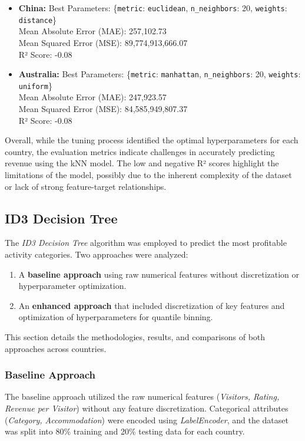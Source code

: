 \documentclass{article}
\begin{document}
\begin{itemize}
    \item \textbf{China:}
    Best Parameters: \{\texttt{metric}: \texttt{euclidean}, \texttt{n\_neighbors}: 20, \texttt{weights}: \texttt{distance}\} \\
    Mean Absolute Error (MAE): 257,102.73 \\
    Mean Squared Error (MSE): 89,774,913,666.07 \\
    R² Score: -0.08 \\

    \item \textbf{Australia:}
    Best Parameters: \{\texttt{metric}: \texttt{manhattan}, \texttt{n\_neighbors}: 20, \texttt{weights}: \texttt{uniform}\} \\
    Mean Absolute Error (MAE): 247,923.57 \\
    Mean Squared Error (MSE): 84,585,949,807.37 \\
    R² Score: -0.08 \\
\end{itemize}

Overall, while the tuning process identified the optimal hyperparameters for each country, the evaluation metrics indicate challenges in accurately predicting revenue using the kNN model. The low and negative R² scores highlight the limitations of the model, possibly due to the inherent complexity of the dataset or lack of strong feature-target relationships.

\subsection{ID3 Decision Tree}
The \textit{ID3 Decision Tree} algorithm was employed to predict the most profitable activity categories. Two approaches were analyzed:
\begin{enumerate}
    \item A \textbf{baseline approach} using raw numerical features without discretization or hyperparameter optimization.
    \item An \textbf{enhanced approach} that included discretization of key features and optimization of hyperparameters for quantile binning.
\end{enumerate}
This section details the methodologies, results, and comparisons of both approaches across countries.

\subsubsection{Baseline Approach}
The baseline approach utilized the raw numerical features (\textit{Visitors, Rating, Revenue per Visitor}) without any feature discretization. Categorical attributes (\textit{Category, Accommodation}) were encoded using \textit{LabelEncoder}, and the dataset was split into 80\% training and 20\% testing data for each country.
\end{document}
